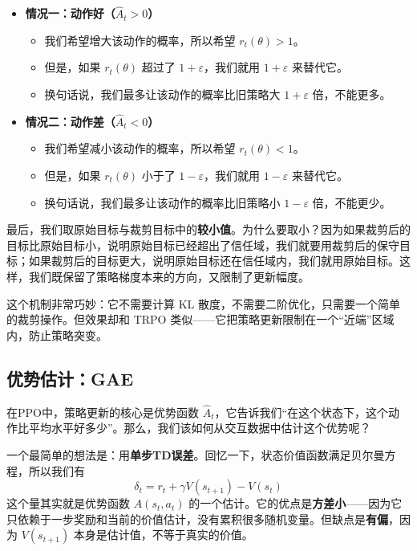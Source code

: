 \documentclass[lang=cn,zihao=-4,a4paper,fontset=windows]{beautybook}
\begin{document}
\begin{itemize}
    \item \textbf{情况一：动作好（\(\hat{A}_t > 0\)）}
        \begin{itemize}
            \item 我们希望增大该动作的概率，所以希望 \(r_t(\theta) > 1\)。
            \item 但是，如果 \(r_t(\theta)\) 超过了 \(1+\varepsilon\)，我们就用 \(1+\varepsilon\) 来替代它。
            \item 换句话说，我们最多让该动作的概率比旧策略大 \(1+\varepsilon\) 倍，不能更多。
        \end{itemize}
    \item \textbf{情况二：动作差（\(\hat{A}_t < 0\)）}
        \begin{itemize}
            \item 我们希望减小该动作的概率，所以希望 \(r_t(\theta) < 1\)。
            \item 但是，如果 \(r_t(\theta)\) 小于了 \(1-\varepsilon\)，我们就用 \(1-\varepsilon\) 来替代它。
            \item 换句话说，我们最多让该动作的概率比旧策略小 \(1-\varepsilon\) 倍，不能更少。
        \end{itemize}
\end{itemize}

最后，我们取原始目标与裁剪目标中的\textbf{较小值}。为什么要取小？因为如果裁剪后的目标比原始目标小，说明原始目标已经超出了信任域，我们就要用裁剪后的保守目标；如果裁剪后的目标更大，说明原始目标还在信任域内，我们就用原始目标。这样，我们既保留了策略梯度本来的方向，又限制了更新幅度。

这个机制非常巧妙：它不需要计算 KL 散度，不需要二阶优化，只需要一个简单的裁剪操作。但效果却和 TRPO 类似——它把策略更新限制在一个“近端”区域内，防止策略突变。

\subsection{优势估计：GAE}

在PPO中，策略更新的核心是优势函数 \(\hat{A}_t\)，它告诉我们“在这个状态下，这个动作比平均水平好多少”。那么，我们该如何从交互数据中估计这个优势呢？

一个最简单的想法是：用\textbf{单步TD误差}。回忆一下，状态价值函数满足贝尔曼方程，所以我们有
\[
\delta_t = r_t + \gamma V(s_{t+1}) - V(s_t)
\]
这个量其实就是优势函数 \(A(s_t, a_t)\) 的一个估计。它的优点是\textbf{方差小}——因为它只依赖于一步奖励和当前的价值估计，没有累积很多随机变量。但缺点是\textbf{有偏}，因为 \(V(s_{t+1})\) 本身是估计值，不等于真实的价值。
\end{document}
